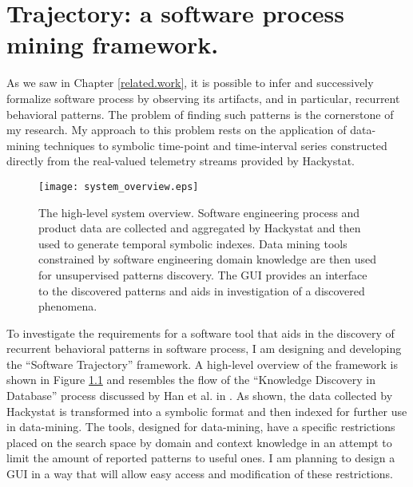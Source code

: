 \chapter{Trajectory: a software process mining framework.} \label{trajectory}
As we saw in Chapter \ref{related.work}, it is possible to infer and successively formalize software process by observing its artifacts, and in particular, recurrent behavioral patterns. The problem of finding such patterns is the cornerstone of my research. My approach to this problem rests on the application of data-mining techniques to symbolic time-point and time-interval series constructed directly from the real-valued telemetry streams provided by Hackystat.

\begin{figure}[tbp]
   \centering
   \texttt{[image: system\_overview.eps]}
   \caption{The high-level system overview. Software engineering process and product data are collected and aggregated by Hackystat and then used to generate temporal symbolic indexes. Data mining tools constrained by software engineering domain knowledge are then used for unsupervised patterns discovery. The GUI provides an interface to the discovered patterns and aids in investigation of a discovered phenomena.}
   \label{fig:system_overview}
\end{figure}


To investigate the requirements for a software tool that aids in the discovery of recurrent behavioral patterns in software process, I am designing and developing the ``Software Trajectory'' framework. A high-level overview of the framework is shown in Figure \ref{fig:system_overview} and resembles the flow of the ``Knowledge Discovery in Database'' process discussed by Han et al. in \cite{citeulike:709476}. As shown, the data collected by Hackystat is transformed into a symbolic format and then indexed for further use in data-mining. The tools, designed for data-mining, have a specific restrictions placed on the search space by domain and context knowledge in an attempt to limit the amount of reported patterns to useful ones. I am planning to design a GUI in a way that will allow easy access and modification of these restrictions. 

